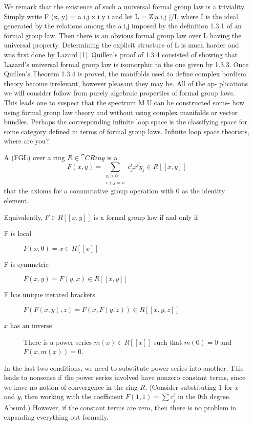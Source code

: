 \documentclass{ccg-topic}
\begin{document}
We remark that the existence
of such a universal formal group law is a triviality.
Simply write F (x, y) =
a i,j x i y i and let L = Z[a i,j ]/I, where I is the ideal
generated by the relations among the a i,j imposed by the definition 1.3.1 of an
formal group law. Then there is an obvious formal group law over L having the
universal property. Determining the explicit structure of L is much harder and was
first done by Lazard [1]. Quillen’s proof of 1.3.4 consisted of showing that Lazard’s
universal formal group law is isomorphic to the one given by 1.3.3.
Once Quillen’s Theorem 1.3.4 is proved, the manifolds used to define complex
bordism theory become irrelevant, however pleasant they may be. All of the ap-
plications we will consider follow from purely algebraic properties of formal group
laws. This leads one to suspect that the spectrum M U can be constructed some-
how using formal group law theory and without using complex manifolds or vector
bundles. Perhaps the corresponding infinite loop space is the classifying space for
some category defined in terms of formal group laws. Infinite loop space theorists,
where are you?

\begin{defn}
    \label{defn:formal_group_law}
    A  (FGL) over a ring $R \in \cat{CRing}$ is a  \[F(x,y) = \sum_{\substack{n\ge0\\i+j=n}}c^i_j x^iy_j \in R[[x,y]]\] that  the axioms for a commutative group operation with $0$ as the identity element. 

Equivalently, $F \in R[[x,y]]$ is a formal group law if and only if
\begin{description}
    \item [F is local] $F(x,0) = x \in R[[x]]$
    \item [F is symmetric] $F(x,y) = F(y,x) \in R[[x,y]]$
    \item [F has unique iterated brackets] $F(F(x,y),z) = F(x, F(y,z)) \in R[[x,y,z]]$
    \item [$x$ has an inverse] There is a power series $m(x) \in R[[x]]$ such that $m(0)=0$ and $F(x,m(x)) = 0$.
\end{description}
\end{defn}

In the last two conditions, we need to substitute power series into another. This leads to nonsense if the power series involved have nonzero constant terms, since we have no notion of convergence in the ring $R$. (Consider substituting $1$ for $x$ and $y$, then working with the coefficient $F(1,1) = \sum c^i_j$ in the $0$th degree. Absurd.) However, if the constant terms are zero, then there is no problem in expanding everything out formally. \cite{Str11}
\end{document}
